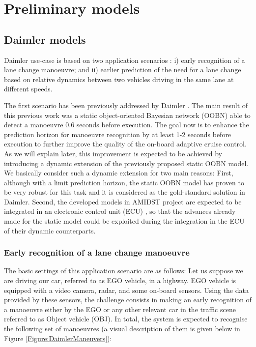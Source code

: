 \section{Preliminary models}
\label{Section:PreliminaryModels}
\subsection{Daimler models}
\label{Section:DaimlerModels}



Daimler use-case is based on two application scenarios \cite{Fer14}: i) early recognition of a lane change manoeuvre; and ii) earlier prediction of the need for a lane change based on relative dynamics between two vehicles driving in the same lane at different speeds. 

The first scenario has been previously addressed by Daimler \cite{kasper2012object}. The main result of this previous work was a static object-oriented Bayesian network (OOBN) \cite{koller1997object} able to detect a manoeuvre 0.6 seconds before execution. The goal now is to enhance the prediction horizon for manoeuvre recognition by at least 1-2 seconds before execution to further improve the quality of the on-board adaptive cruise control. As we will explain later, this improvement is expected to be achieved by introducing a dynamic extension of the previously proposed static OOBN model. We basically consider such a dynamic extension for two main reasons: First, although with a limit prediction horizon, the static OOBN model has proven to be very robust for this task and it is considered as the gold-standard solution in Daimler. Second, the developed models in AMIDST project are expected to be integrated in an electronic control unit (ECU) \cite{Fer14}, so that the advances already made for the static model \cite{Weidl2014} could be exploited during the integration in the ECU of their dynamic counterparts. 

\subsubsection{Early recognition of a lane change manoeuvre}
\label{Section:Daimler:EarlyRecognition}

The basic settings of this application scenario are as follows: Let us suppose we are driving our car, referred to as EGO vehicle, in a highway. EGO vehicle is equipped with a video camera, radar, and some on-board sensors. Using the data provided by these sensors, the challenge consists in making an early recognition of a manoeuvre either by the EGO or any other relevant car in the traffic scene referred to as Object vehicle (OBJ). In total, the system is expected to recognise the following set of manoeuvres (a visual description of them is given below in Figure \ref{Figure:DaimlerManeuvers}):

